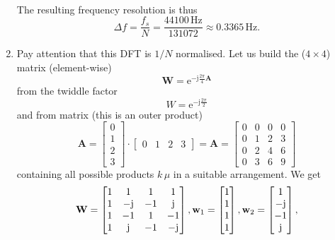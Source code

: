 \documentclass[11pt,a4paper,DIV=12]{scrartcl}
\begin{document}
\begin{Loesung}
\begin{enumerate}[label=\alph*)]
\begin{align}
	\end{align}
	The resulting frequency resolution is thus
	\begin{equation}
	\Delta f=\frac{f_s}{N}=\frac{44100\,\text{Hz}}{131072}\approx0.3365\,\text{Hz}.\nonumber
	\end{equation}
	\item
	Pay attention that this DFT is $1/N$ normalised.
	Let us build the ($4\times 4$) matrix (element-wise)
	\begin{equation}
	\mathbf{W} = \mathrm{e}^{-\mathrm{j}\frac{2\pi}{4} \mathbf{A}}
	\end{equation}
	from the twiddle factor
	\begin{equation}
	W = \mathrm{e}^{-\mathrm{j}\frac{2\pi}{2}}
	\end{equation}
	and from matrix (this is an outer product)
	\begin{equation}
	\mathbf{A} =
	\begin{bmatrix}
	0\\
	1\\
	2\\
	3
	\end{bmatrix}
	\cdot
	\begin{bmatrix}
	0 & 1 & 2 & 3
	\end{bmatrix}
	=
	\mathbf{A} =
	\begin{bmatrix}
	0 & 0 & 0 & 0\\
	0 & 1 & 2 & 3\\
	0 & 2 & 4 & 6\\
	0 & 3 & 6 & 9
	\end{bmatrix}
	\end{equation}
	containing all possible products $k\,\mu$ in a suitable arrangement.
	We get
	\begin{align}
	\mathbf{W} = \begin{bmatrix}
	1 & 1 & 1 & 1\\
	1 & -\mathrm{j} & -1 & \mathrm{j}\\
	1 & -1 & 1 & -1\\
	1 & \mathrm{j} & -1 & -\mathrm{j}
	\end{bmatrix},
	\mathbf{w}_1 = \begin{bmatrix}1\\1\\1\\1\end{bmatrix},
	\mathbf{w}_2 = \begin{bmatrix}1\\-\im\\-1\\\im\end{bmatrix},

\end{align}
\end{enumerate}
\end{Loesung}
\end{document}

